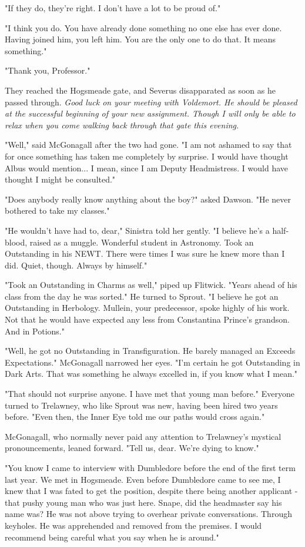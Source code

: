 "If they do, they're right. I don't have a lot to be proud of."

"I think you do. You have already done something no one else has ever done. Having joined him, you left him. You are the only one to do that. It means something."

"Thank you, Professor."

They reached the Hogsmeade gate, and Severus disapparated as soon as he passed through. \emph{Good luck on your meeting with Voldemort. He should be pleased at the successful beginning of your new assignment. Though I will only be able to relax when you come walking back through that gate this evening.}

"Well," said McGonagall after the two had gone. "I am not ashamed to say that for once something has taken me completely by surprise. I would have thought Albus would mention... I mean, since I am Deputy Headmistress. I would have thought I might be consulted."

"Does anybody really know anything about the boy?" asked Dawson. "He never bothered to take my classes."

"He wouldn't have had to, dear," Sinistra told her gently. "I believe he's a half-blood, raised as a muggle. Wonderful student in Astronomy. Took an Outstanding in his NEWT. There were times I was sure he knew more than I did. Quiet, though. Always by himself."

"Took an Outstanding in Charms as well," piped up Flitwick. "Years ahead of his class from the day he was sorted." He turned to Sprout. "I believe he got an Outstanding in Herbology. Mullein, your predecessor, spoke highly of his work. Not that he would have expected any less from Constantina Prince's grandson. And in Potions."

"Well, he got no Outstanding in Transfiguration. He barely managed an Exceeds Expectations." McGonagall narrowed her eyes. "I'm certain he got Outstanding in Dark Arts. That was something he always excelled in, if you know what I mean."

"That should not surprise anyone. I have met that young man before." Everyone turned to Trelawney, who like Sprout was new, having been hired two years before. "Even then, the Inner Eye told me our paths would cross again."

McGonagall, who normally never paid any attention to Trelawney's mystical pronouncements, leaned forward. "Tell us, dear. We're dying to know."

"You know I came to interview with Dumbledore before the end of the first term last year. We met in Hogsmeade. Even before Dumbledore came to see me, I knew that I was fated to get the position, despite there being another applicant - that pushy young man who was just here. Snape, did the headmaster say his name was? He was not above trying to overhear private conversations. Through keyholes. He was apprehended and removed from the premises. I would recommend being careful what you say when he is around."

